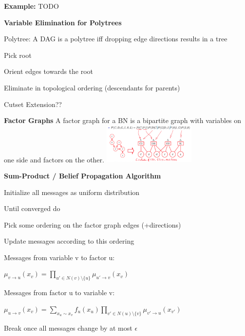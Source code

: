 \documentclass[a4paper, 11pt]{scrartcl}
\begin{document}
\begin{multicols*}{3}
\begin{compactitem}
	\end{compactitem}
	
	\textbf{Example:} TODO
		
	\textbf{Variable Elimination for Polytrees}
	
	Polytree: A DAG is a polytree iff dropping edge directions results in a tree
	\begin{compactitem}
		\item Pick root
		\item Orient edges towards the root
		\item Eliminate in topological ordering (descendants for parents)
	\end{compactitem}

	Cutset Extension??
	
	\textbf{Factor Graphs}
	A factor graph for a BN is a bipartite graph with variables on one side and  factors on the other.
	\includegraphics[height=2cm]{img/pai2.png}
	
	\textbf{Sum-Product / Belief Propagation Algorithm}	
	
	\begin{compactitem}
		\item Initialize all messages as uniform distribution  
		\item Until converged do
		\begin{compactenum}
			\item Pick some ordering on the factor graph edges (+directions)   
			\item Update messages according to this ordering
			
			Messages from variable v to factor u: 
			
			$\mu_{v \rightarrow u}(x_v) = \prod_{u' \in N(v) \setminus \{u\}} \mu_{u' \rightarrow v}(x_{v})$ 
			
			Messages from factor u to variable v:
			
			$\mu_{u \rightarrow v}(x_v) = \sum_{x_u \sim x_v} f_u(x_u) \prod_{v' \in N(u) \setminus \{v\}} \mu_{v' \rightarrow u}(x_{v'})$ 

			\item Break once all messages change by at most $\epsilon$
		\end{compactenum}
	\end{compactitem}


\end{multicols*}
\end{document}
